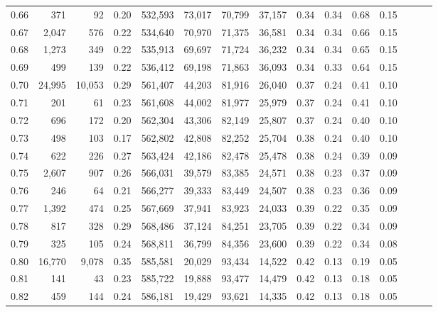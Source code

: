 \begin{tabular}{rrrrrrrrrrrrrrr}
0.66 &     371 &      92 &  0.20 &  532,593 &   73,017 &   70,799 &   37,157 &  0.34 &  0.34 &  0.68 &      0.15 \\
0.67 &   2,047 &     576 &  0.22 &  534,640 &   70,970 &   71,375 &   36,581 &  0.34 &  0.34 &  0.66 &      0.15 \\
0.68 &   1,273 &     349 &  0.22 &  535,913 &   69,697 &   71,724 &   36,232 &  0.34 &  0.34 &  0.65 &      0.15 \\
0.69 &     499 &     139 &  0.22 &  536,412 &   69,198 &   71,863 &   36,093 &  0.34 &  0.33 &  0.64 &      0.15 \\
0.70 &  24,995 &  10,053 &  0.29 &  561,407 &   44,203 &   81,916 &   26,040 &  0.37 &  0.24 &  0.41 &      0.10 \\
0.71 &     201 &      61 &  0.23 &  561,608 &   44,002 &   81,977 &   25,979 &  0.37 &  0.24 &  0.41 &      0.10 \\
0.72 &     696 &     172 &  0.20 &  562,304 &   43,306 &   82,149 &   25,807 &  0.37 &  0.24 &  0.40 &      0.10 \\
0.73 &     498 &     103 &  0.17 &  562,802 &   42,808 &   82,252 &   25,704 &  0.38 &  0.24 &  0.40 &      0.10 \\
0.74 &     622 &     226 &  0.27 &  563,424 &   42,186 &   82,478 &   25,478 &  0.38 &  0.24 &  0.39 &      0.09 \\
0.75 &   2,607 &     907 &  0.26 &  566,031 &   39,579 &   83,385 &   24,571 &  0.38 &  0.23 &  0.37 &      0.09 \\
0.76 &     246 &      64 &  0.21 &  566,277 &   39,333 &   83,449 &   24,507 &  0.38 &  0.23 &  0.36 &      0.09 \\
0.77 &   1,392 &     474 &  0.25 &  567,669 &   37,941 &   83,923 &   24,033 &  0.39 &  0.22 &  0.35 &      0.09 \\
0.78 &     817 &     328 &  0.29 &  568,486 &   37,124 &   84,251 &   23,705 &  0.39 &  0.22 &  0.34 &      0.09 \\
0.79 &     325 &     105 &  0.24 &  568,811 &   36,799 &   84,356 &   23,600 &  0.39 &  0.22 &  0.34 &      0.08 \\
0.80 &  16,770 &   9,078 &  0.35 &  585,581 &   20,029 &   93,434 &   14,522 &  0.42 &  0.13 &  0.19 &      0.05 \\
0.81 &     141 &      43 &  0.23 &  585,722 &   19,888 &   93,477 &   14,479 &  0.42 &  0.13 &  0.18 &      0.05 \\
0.82 &     459 &     144 &  0.24 &  586,181 &   19,429 &   93,621 &   14,335 &  0.42 &  0.13 &  0.18 &      0.05 \\

\end{tabular}
